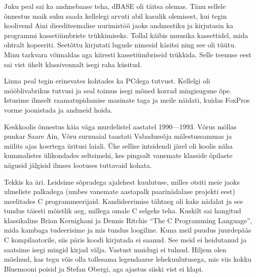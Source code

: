 Juku peal sai ka andmebaase teha, dBASE oli täitsa olemas. 
Tänu sellele õnnestus maik suhu saada kellelegi arvuti abil kasulik olemisest, kui tegin 
koolivend Aini dieediteemalise uurimistöö jaoks andmestiku ja kirjutasin 
ka programmi kassetiümbriste trükkimiseks. Tollal käibis muusika kassettidel, 
mida ohtralt kopeeriti. 
Seetõttu kirjutati lugude 
nimesid käsitsi ning see oli tüütu. Minu tarkvara võimaldas aga kiiresti 
kassetiümbriseid trükkida. Selle teenuse eest sai vist ühelt 
klassivennalt isegi raha küsitud.

Linna peal tegin erinevates kohtades ka PCdega tutvust. Kellelgi oli mööblivabrikus 
tutvusi ja seal toimus isegi mõned korrad mingisugune õpe. Istusime ilmselt 
raamatupidamise masinate taga ja meile näidati, kuidas FoxPros 
vorme joonistada ja andmeid hoida. 

Keskkoolis õnnestus käia väga murdelistel aastatel 1990---1993. Võrus möllas 
punkar Saare Ain, Võru surnuaial 
taastati Vabadussõja mälestussammas ja miilits ajas koertega üritusi laiali. 
Ühe sellise intsidendi järel oli koolis näha kummalistes ülikondades 
seltsimehi, kes pingsalt vanemate klasside õpilaste nägusid jälgisid ilmses 
lootuses tuttavaid kohata. 

Tekkis ka äri. Leidsime sõpradega 
ajalehest kuulutuse, milles otsiti meie jaoks ulmeliste palkadega (umbes 
vanemate aastapalk paarinädalase projekti eest) meelitades C 
programmeerijaid. Kandideerimise tähtaeg oli kaks nädalat ja see 
tundus täiesti mõistlik aeg, millega omale C selgeks teha. Kuskilt sai hangitud 
klassikaline Brian Kernighani ja Dennis Ritchie \enquote{The C Programming 
Language}, mida kambaga tudeerisime ja mis tundus 
loogiline. Kuna meil puudus juurdepääs C kompilaatorile, siis päris koodi 
kirjutada ei saanud. See meid ei heidutanud ja saatsime isegi mingid kirjad välja. Vastust muidugi ei tulnud. Hiljem olen mõelnud, kas tegu võis olla 
tollesama legendaarse lehekuulutusega, mis viis kokku Bluemooni 
poisid ja Stefan Obergi, aga ajastus siiski vist ei klapi. 


